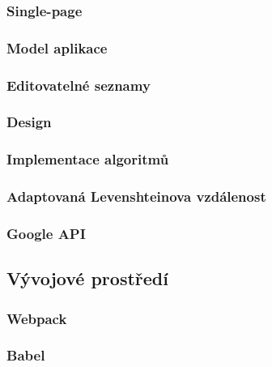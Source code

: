 \documentclass[a4paper,11pt,titlepage,fleqn]{article}
\begin{document}
        \subsubsection{Single-page}

        \subsubsection{Model aplikace}

        \subsubsection{Editovatelné seznamy}

        \subsubsection{Design}

        \subsubsection{Implementace algoritmů}

        \subsubsection{Adaptovaná Levenshteinova vzdálenost}

        \subsubsection{Google API}

    \subsection{Vývojové prostředí}
        \subsubsection{Webpack}

        \subsubsection{Babel}
\end{document}
